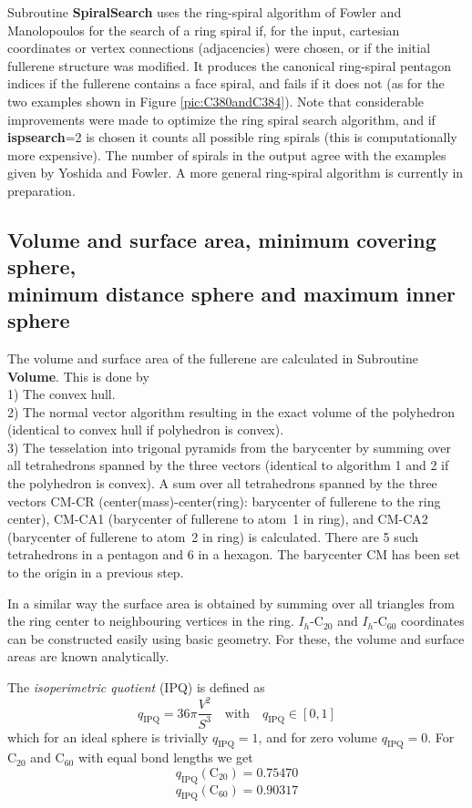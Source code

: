 \documentclass[article,a4paper,twoside]{memoir}
\newcommand{\C}[1]{\ensuremath{\mathrm{C}_{#1}}}
\newcommand{\funname}[1]{{\color{blue}\textbf{#1}}}
\newcommand{\paramname}[1]{{\color{green}\textbf{#1}}}
\begin{document}
Subroutine \funname{SpiralSearch} uses the ring-spiral algorithm of Fowler and Manolopoulos \cite{Atlas}
for the search of a ring spiral if, for the input, cartesian coordinates or vertex connections (adjacencies) were chosen, or if the
initial fullerene structure was modified. It produces the canonical ring-spiral pentagon indices
if the fullerene contains a face spiral, and fails if it does not (as for the two examples shown in 
Figure \ref{pic:C380andC384}). Note that considerable improvements were made to optimize the ring spiral search algorithm, and if 
\paramname{ispsearch}=2 is chosen it counts all possible ring spirals (this is computationally more expensive). 
The number of spirals in the output agree with the examples given by Yoshida and Fowler.\cite{Yoshida97a} 
A more general ring-spiral algorithm is currently in preparation.

\subsection{Volume and surface area, minimum covering sphere, \\ minimum distance sphere and maximum inner sphere}
The volume and surface area of the fullerene are calculated in Subroutine \funname{Volume}. This is done by\\
1) The convex hull.\\
2) The normal vector algorithm resulting in the exact volume of the polyhedron (identical to convex hull if polyhedron is convex).\\
3) The tesselation into trigonal pyramids from the barycenter by summing over all tetrahedrons spanned
by the three vectors (identical to algorithm 1 and 2 if the polyhedron is convex).  A sum over all
tetrahedrons spanned by the three vectors CM-CR (center(mass)-center(ring): barycenter of fullerene to the ring center),
CM-CA1 (barycenter of fullerene to atom~1 in ring), and CM-CA2 (barycenter of fullerene  to atom~2 in ring) is calculated.
There are 5 such tetrahedrons in a pentagon and 6 in a hexagon.  The barycenter CM has been set to the origin in a previous step.

In a similar way the surface area is obtained by summing over all triangles from the ring center to
neighbouring vertices in the ring. $I_h$-\C{20} and $I_h$-\C{60} coordinates can be constructed easily
using basic geometry. For these, the volume and surface areas are known analytically.

The \textit{isoperimetric quotient} (IPQ) is defined as
\begin{equation}
 q_{\textrm{IPQ}} =36\pi \frac{V^{2} }{S^{3}}\quad\text{with}\quad q_{\textrm{IPQ}}\in [0,1]
 \label{IPQ}
 \end{equation}
which for an ideal sphere is trivially $q_{\textrm{IPQ}}=1$, and for zero volume $q_{\textrm{IPQ}}=0$. For \C{20} 
and \C{60} with equal bond lengths we get
\begin{equation}
\label{IPQC20}
q_{\textrm{IPQ}} (\C{20}) =0.75470 
\end{equation} 
\begin{equation}
\label{IPQC60}
q_{\textrm{IPQ}} (\C{60}) =0.90317 
\end{equation} 
\end{document}
